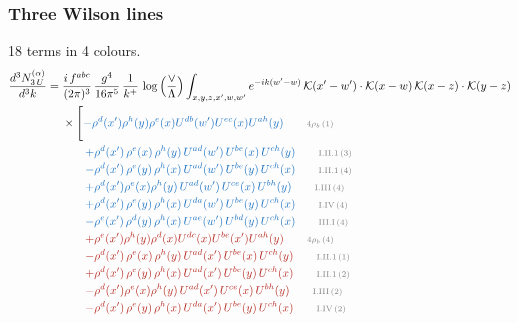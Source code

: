 \documentclass[10pt]{article}
\begin{document}
\subsubsection{Three Wilson lines}
18 terms in 4 colours.
\begin{align}
\frac{d^{3}N^{(\alpha)}_{3\,U}}{d^{3}k}={}&\frac{i\,f^{abc}}{(2\pi)^{3}}\,\frac{g^{4}}{16\pi^{5}}\,\frac{1}{k^{+}}\,\log\Big(\frac{\vee}{\Lambda}\Big)\int_{x,y,z,x',w,w'}e^{-ik(w'-w)}\,\mathcal{K}(x'-w')\cdot\mathcal{K}(x-w)\,\mathcal{K}(x-z)\cdot\mathcal{K}(y-z)\notag\\
&\times\Bigg[{\color{RoyalBlue}-\rho^{d}(x') \rho^{h}(y) \rho^{e}(x) U^{d b}(w') U^{e c}(x) U^{a h}(y)}\tag*{\color{gray}\scriptsize $4\rho_b$\,(1)}\\
&\qquad{\color{RoyalBlue}+\rho^{d}(x')\,\rho^{e}(x)\,\rho^{h}(y)\,U^{ad}(w')\,U^{be}(x)\,U^{ch}(y)}\tag*{\color{gray}\scriptsize I.II.1\,(3)}\\
&\qquad{\color{RoyalBlue}-\rho^{d}(x')\,\rho^{e}(y)\,\rho^{h}(x)\,U^{ad}(w')\,U^{be}(y)\,U^{ch}(x)}\tag*{\color{gray}\scriptsize I.II.1\,(4)}\\
&\qquad{\color{RoyalBlue}+\rho^{d}(x')\rho^{e}(x)\rho^{h}(y)\, U^{ad}(w')\,U^{ce}(x)\, U^{bh}(y)}\tag*{\color{gray}\scriptsize I.III\,(4)}\\
&\qquad{\color{RoyalBlue}+\rho^{d}(x')\, \rho^{e}(y)\,\rho^{h}(x)\, U^{da}(w')\,U^{be}(y)\,U^{ch}(x)}\tag*{\color{gray}\scriptsize I.IV\,(4)}\\
&\qquad{\color{RoyalBlue}-\rho^{e}(x')\,\rho^{d}(y)\,\rho^{h}(x)\,U^{ae}(w')\,U^{bd}(y)\,U^{ch}(x)}\tag*{\color{gray}\scriptsize III.I\,(4)}\\
&\qquad{\color{BrickRed}+\rho^{e}(x') \rho^{h}(y) \rho^{d}(x) U^{d c}(x) U^{b e}(x') U^{a h}(y)}\tag*{\color{gray}\scriptsize $4\rho_b$\,(4)}\\
&\qquad{\color{BrickRed}-\rho^{d}(x')\,\rho^{e}(x)\,\rho^{h}(y)\,U^{ad}(x')\,U^{be}(x)\,U^{ch}(y)}\tag*{\color{gray}\scriptsize I.II.1\,(1)}\\
&\qquad{\color{BrickRed}+\rho^{d}(x')\,\rho^{e}(y)\,\rho^{h}(x)\,U^{ad}(x')\,U^{be}(y)\,U^{ch}(x)}\tag*{\color{gray}\scriptsize I.II.1\,(2)}\\
&\qquad{\color{BrickRed}-\rho^{d}(x')\rho^{e}(x)\rho^{h}(y)\, U^{ad}(x')\,U^{ce}(x)\, U^{bh}(y)}\tag*{\color{gray}\scriptsize I.III\,(2)}\\
&\qquad{\color{BrickRed}-\rho^{d}(x')\, \rho^{e}(y)\,\rho^{h}(x)\, U^{da}(x')\,U^{be}(y)\,U^{ch}(x)}\tag*{\color{gray}\scriptsize I.IV\,(2)}\\

\end{align}
\end{document}
